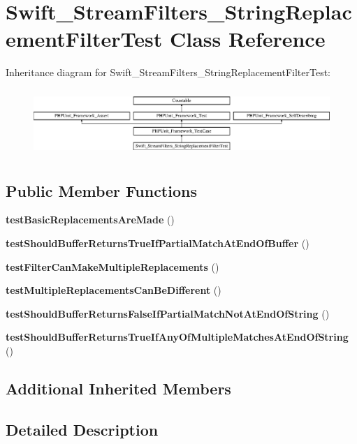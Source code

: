 \section{Swift\+\_\+\+Stream\+Filters\+\_\+\+String\+Replacement\+Filter\+Test Class Reference}
\label{class_swift___stream_filters___string_replacement_filter_test}
Inheritance diagram for Swift\+\_\+\+Stream\+Filters\+\_\+\+String\+Replacement\+Filter\+Test\+:\begin{figure}[H]
\begin{center}
\leavevmode
\includegraphics[height=2.557078cm]{class_swift___stream_filters___string_replacement_filter_test}
\end{center}
\end{figure}
\subsection*{Public Member Functions}
\begin{DoxyCompactItemize}
\item 
{\bf test\+Basic\+Replacements\+Are\+Made} ()
\item 
{\bf test\+Should\+Buffer\+Returns\+True\+If\+Partial\+Match\+At\+End\+Of\+Buffer} ()
\item 
{\bf test\+Filter\+Can\+Make\+Multiple\+Replacements} ()
\item 
{\bf test\+Multiple\+Replacements\+Can\+Be\+Different} ()
\item 
{\bf test\+Should\+Buffer\+Returns\+False\+If\+Partial\+Match\+Not\+At\+End\+Of\+String} ()
\item 
{\bf test\+Should\+Buffer\+Returns\+True\+If\+Any\+Of\+Multiple\+Matches\+At\+End\+Of\+String} ()
\end{DoxyCompactItemize}
\subsection*{Additional Inherited Members}


\subsection{Detailed Description}



